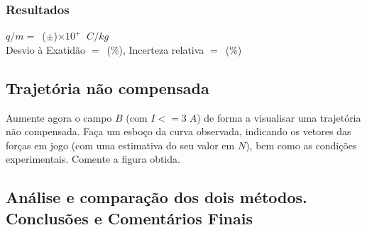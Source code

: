 \documentclass[a4paper,12pt]{article}  %
\begin{document}
\subsubsection{\sf Resultados}
\noindent  $q/m =$~(\underline{\makebox[1.5cm][r]{~}}$\pm$\underline{\makebox[1cm][r]{~}})$\times 10^{+} \;\;C/kg  $\\  


\noindent  Desvio à Exatidão $=$~\underline{\makebox[1cm][r]{~}}(\%), 
Incerteza relativa $=$~\underline{\makebox[1cm][r]{~}}($\%$) 


\subsection{\sf Trajetória não compensada}
Aumente agora o campo $B$ (com $I<= 3\; A$) de forma a visualisar uma trajetória não compensada.  Faça um esboço da curva observada, indicando os vetores das forças em jogo (com uma estimativa do seu valor em $N$), bem como as condições experimentais. Comente a figura obtida.
\begin{center}
\framebox[18cm]{\rule{0pt}{6.5cm}}
\end{center}

\subsection{\sf Análise e comparação dos dois métodos. Conclusões e Comentários Finais}
\noindent\underline{\makebox[\textwidth][r]{~}} \\
\noindent\underline{\makebox[\textwidth][r]{~}} \\
\noindent\underline{\makebox[\textwidth][r]{~}} \\
\noindent\underline{\makebox[\textwidth][r]{~}} \\
\noindent\underline{\makebox[\textwidth][r]{~}} \\
\noindent\underline{\makebox[\textwidth][r]{~}} \\
\noindent\underline{\makebox[\textwidth][r]{~}} \\
\noindent\underline{\makebox[\textwidth][r]{~}} \\
\noindent\underline{\makebox[\textwidth][r]{~}} \\
\noindent\underline{\makebox[\textwidth][r]{~}} \\
\noindent\underline{\makebox[\textwidth][r]{~}} \\
\noindent\underline{\makebox[\textwidth][r]{~}} \\
\noindent\underline{\makebox[17cm][r]{~}} \\



\end{document}
